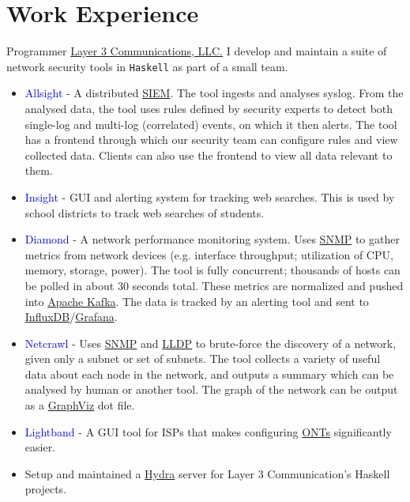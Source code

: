 \documentclass[10pt,letterpaper,sans]{moderncv}
\newcommand{\wlink}[2]{\textcolor[HTML]{461645}{\href{#1}{#2}}}
\newcommand{\lang}[1]{\texttt{#1}}
\begin{document}
\makecvtitle{}


\section{Work Experience}
  {Programmer}
  {\wlink{https://layer3com.com}{Layer 3 Communications, LLC.}}
  {\newline I develop and maintain a suite of network security tools in \lang{Haskell} as part of a small team.
  }
  {}
  {
\begin{itemize}
  \item \textcolor{blue}{Allsight} - A distributed \wlink{https://en.wikipedia.org/wiki/Security_information_and_event_management}{SIEM}. The tool ingests and analyses syslog. From the analysed data, the tool uses rules defined by security experts to detect both single-log and multi-log (correlated) events, on which it then alerts. The tool has a frontend through which our security team can configure rules and view collected data. Clients can also use the frontend to view all data relevant to them.
  \item \textcolor{blue}{Insight} - GUI and alerting system for tracking web searches. This is used by school districts to track web searches of students.
  \item \textcolor{blue}{Diamond} - A network performance monitoring system. Uses \wlink{https://en.wikipedia.org/wiki/Simple_Network_Management_Protocol}{SNMP} to gather metrics from network devices (e.g. interface throughput; utilization of CPU, memory, storage, power). The tool is fully concurrent; thousands of hosts can be polled in about 30 seconds total. These metrics are normalized and pushed into \wlink{https://kafka.apache.org/}{Apache Kafka}. The data is tracked by an alerting tool and sent to \wlink{https://www.influxdata.com/}{InfluxDB}/\wlink{https://grafana.com/}{Grafana}.
  \item \textcolor{blue}{Netcrawl} - Uses \wlink{https://en.wikipedia.org/wiki/Simple_Network_Management_Protocol}{SNMP} and \wlink{https://en.wikipedia.org/wiki/Link_Layer_Discovery_Protocol}{LLDP} to brute-force the discovery of a network, given only a subnet or set of subnets. The tool collects a variety of useful data about each node in the network, and outputs a summary which can be analysed by human or another tool. The graph of the network can be output as a \wlink{http://www.graphviz.org/}{GraphViz} dot file.
  \item \textcolor{blue}{Lightband} - A GUI tool for ISPs that makes configuring \wlink{https://en.wikipedia.org/wiki/Network_interface_device\#Optical_network_terminals}{ONTs} significantly easier.
  \item Setup and maintained a \wlink{https://nixos.org/hydra/}{Hydra} server for Layer 3 Communication's Haskell projects.
\end{itemize}
}
\end{document}
